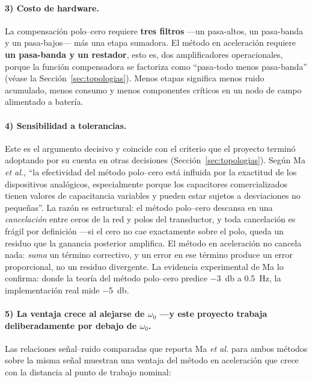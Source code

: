 \paragraph{3) Costo de hardware.}
La compensaci\'on polo--cero requiere \textbf{tres filtros} ---un pasa-altos, un
pasa-banda y un pasa-bajos--- m\'as una etapa sumadora. El m\'etodo en aceleraci\'on
requiere \textbf{un pasa-banda y un restador}, esto es, dos amplificadores operacionales,
porque la funci\'on compensadora se factoriza como ``pasa-todo menos pasa-banda''
(v\'ease la Secci\'on~\ref{sec:topologias}). Menos etapas significa menos ruido
acumulado, menos consumo y menos componentes cr\'iticos en un nodo de campo alimentado a
bater\'ia.

\paragraph{4) Sensibilidad a tolerancias.}
Este es el argumento decisivo y coincide con el criterio que el proyecto termin\'o
adoptando por su cuenta en otras decisiones (Secci\'on~\ref{sec:topologias}). Seg\'un
Ma \emph{et al.}, ``la efectividad del m\'etodo polo--cero est\'a influida por la
exactitud de los dispositivos anal\'ogicos, especialmente porque los capacitores
comercializados tienen valores de capacitancia variables y pueden estar sujetos a
desviaciones no peque\~nas''. La raz\'on es estructural: el m\'etodo polo--cero descansa
en una \emph{cancelaci\'on} entre ceros de la red y polos del transductor, y toda
cancelaci\'on es fr\'agil por definici\'on ---si el cero no cae exactamente sobre el polo,
queda un residuo que la ganancia posterior amplifica. El m\'etodo en aceleraci\'on no
cancela nada: \emph{suma} un t\'ermino correctivo, y un error en ese t\'ermino produce un
error proporcional, no un residuo divergente. La evidencia experimental de Ma lo
confirma: donde la teor\'ia del m\'etodo polo--cero predice \SI{-3}{\decibel} a
\SI{0.5}{\hertz}, la implementaci\'on real mide \SI{-5}{\decibel}.

\paragraph{5) La ventaja crece al alejarse de $\omega_0$ ---y este proyecto trabaja
deliberadamente por debajo de $\omega_0$.}
Las relaciones se\~nal--ruido comparadas que reporta Ma \emph{et al.} para ambos m\'etodos
sobre la misma se\~nal muestran una ventaja del m\'etodo en aceleraci\'on que crece con la
distancia al punto de trabajo nominal:

